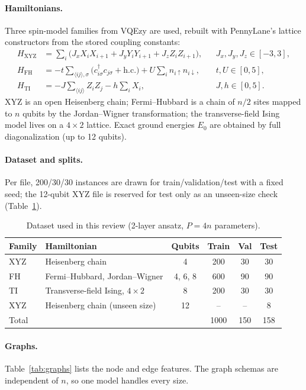 \documentclass{ssnreview}
\begin{document}
\paragraph{Hamiltonians.} Three spin-model families from VQEzy are used, rebuilt with
PennyLane's lattice constructors from the stored coupling constants:
\begin{align}
  H_{\text{XYZ}} &= \sum_{i}\big(J_x X_iX_{i+1}+J_y Y_iY_{i+1}+J_z Z_iZ_{i+1}\big), &&
     J_x,J_y,J_z\in[-3,3],\\
  H_{\text{FH}} &= -t\sum_{\langle ij\rangle,\sigma}\big(c^\dagger_{i\sigma}c_{j\sigma}+\text{h.c.}\big)
     +U\sum_i n_{i\uparrow}n_{i\downarrow}, && t,U\in[0,5],\\
  H_{\text{TI}} &= -J\sum_{\langle ij\rangle} Z_iZ_j - h\sum_i X_i, && J,h\in[0,5].
\end{align}
XYZ is an open Heisenberg chain; Fermi--Hubbard is a chain of $n/2$ sites mapped to $n$ qubits
by the Jordan--Wigner transformation; the transverse-field Ising model lives on a $4\times2$
lattice. Exact ground energies $E_0$ are obtained by full diagonalization (up to 12 qubits).

\paragraph{Dataset and splits.} Per file, 200/30/30 instances are drawn for
train/validation/test with a fixed seed; the 12-qubit XYZ file is reserved for test only as an
unseen-size check (Table~\ref{tab:data}).

\begin{table}[H]
\centering
\caption{Dataset used in this review (2-layer ansatz, $P=4n$ parameters).}\label{tab:data}
\begin{tabular}{llcccc}
\toprule
Family & Hamiltonian & Qubits & Train & Val & Test \\
\midrule
XYZ & Heisenberg chain & 4 & 200 & 30 & 30 \\
FH  & Fermi--Hubbard, Jordan--Wigner & 4, 6, 8 & 600 & 90 & 90 \\
TI  & Transverse-field Ising, $4\times2$ & 8 & 200 & 30 & 30 \\
XYZ & Heisenberg chain (unseen size) & 12 & -- & -- & 8 \\
\midrule
\multicolumn{3}{l}{Total} & 1000 & 150 & 158 \\
\bottomrule
\end{tabular}
\end{table}

\paragraph{Graphs.} Table~\ref{tab:graphs} lists the node and edge features. The graph schemas
are independent of $n$, so one model handles every size.
\end{document}
